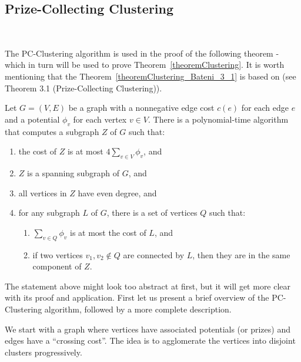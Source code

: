 \subsection{Prize-Collecting Clustering}~\label{subsection:pc_clustering}

The PC-Clustering algorithm is used in the proof of the following theorem - which in turn will be used to prove Theorem~\ref{theoremClustering}. 
It is worth mentioning that the Theorem~\ref{theoremClustering_Bateni_3_1} is based on \cite{Bateni} (see Theorem 3.1 (Prize-Collecting Clustering)).

\begin{ftheo} \label{theoremClustering_Bateni_3_1}
Let \(G=(V, E)\) be a graph with a nonnegative edge cost \(c(e)\) for each edge \(e\) and a potential \(\phi_v\) for each vertex \(v \in V\). 
There is a polynomial-time algorithm that computes a subgraph \(Z\) of \(G\) such that:

\begin{enumerate}
    \item the cost of \(Z\) is at most \(4 \sum \limits_{v \in V} \phi_v\), and~\label{condition:1}
    \item \(Z\) is a spanning subgraph of \(G\), and~\label{condition:2}
    \item all vertices in \(Z\) have even degree, and~\label{condition:3}
    \item for any subgraph \(L\) of \(G\), there is a set  of vertices \(Q\) such that: \label{condition:4}
    \begin{enumerate}
        \item \(\sum \limits_{v \in Q} \phi_v\) is at most the cost of \(L\), and \label{condition:4a}
        \item if two vertices \(v_1, v_2 \notin Q\) are connected by \(L\), then they are  in the same component of \(Z\).~\label{condition:4b}
    \end{enumerate}
\end{enumerate}
\end{ftheo}

The statement above might look too abstract at first, but it will get more clear with its proof and application. First let us present a brief overview of the PC-Clustering algorithm, followed by a more complete description.

We start with a graph where vertices have associated potentials (or prizes) and edges have a ``crossing cost''. The idea is to agglomerate the vertices into disjoint clusters progressively. 

